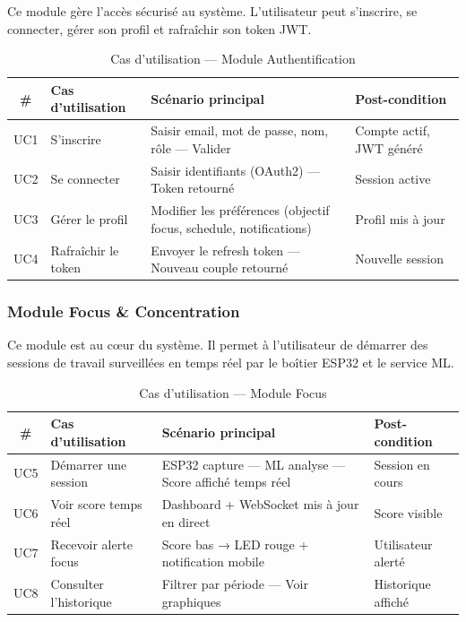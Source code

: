 \documentclass[12pt,a4paper]{report}
\begin{document}
Ce module gère l'accès sécurisé au système. L'utilisateur peut s'inscrire, se connecter, gérer son profil et rafraîchir son token \ac{JWT}.

\begin{table}[H]
    \centering
    \caption{Cas d'utilisation — Module Authentification}
    \renewcommand{\arraystretch}{1.3}
    \begin{tabular}{|c|p{3cm}|p{4.5cm}|p{4cm}|}
        \hline
        \textbf{\#} & \textbf{Cas d'utilisation} & \textbf{Scénario principal} & \textbf{Post-condition} \\
        \hline
        UC1 & S'inscrire & Saisir email, mot de passe, nom, rôle — Valider & Compte actif, JWT généré \\
        \hline
        UC2 & Se connecter & Saisir identifiants (OAuth2) — Token retourné & Session active \\
        \hline
        UC3 & Gérer le profil & Modifier les préférences (objectif focus, schedule, notifications) & Profil mis à jour \\
        \hline
        UC4 & Rafraîchir le token & Envoyer le refresh token — Nouveau couple retourné & Nouvelle session \\
        \hline
    \end{tabular}
\end{table}

\subsubsection{Module Focus \& Concentration}

Ce module est au cœur du système. Il permet à l'utilisateur de démarrer des sessions de travail surveillées en temps réel par le boîtier ESP32 et le service ML.

\begin{table}[H]
    \centering
    \caption{Cas d'utilisation — Module Focus}
    \renewcommand{\arraystretch}{1.3}
    \begin{tabular}{|c|p{3cm}|p{4.5cm}|p{4cm}|}
        \hline
        \textbf{\#} & \textbf{Cas d'utilisation} & \textbf{Scénario principal} & \textbf{Post-condition} \\
        \hline
        UC5 & Démarrer une session & ESP32 capture — ML analyse — Score affiché temps réel & Session en cours \\
        \hline
        UC6 & Voir score temps réel & Dashboard + WebSocket mis à jour en direct & Score visible \\
        \hline
        UC7 & Recevoir alerte focus & Score bas → LED rouge + notification mobile & Utilisateur alerté \\
        \hline
        UC8 & Consulter l'historique & Filtrer par période — Voir graphiques & Historique affiché \\
        \hline
    \end{tabular}
\end{table}
\end{document}
